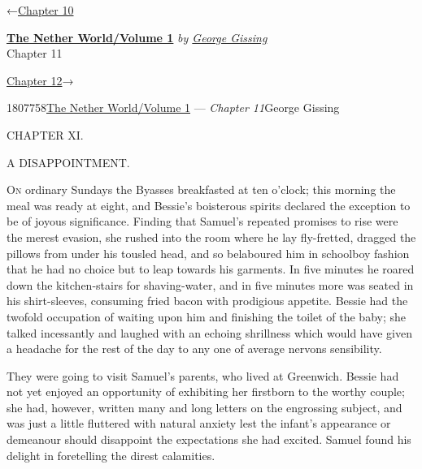 \hypertarget{headerContainer}{}
\hypertarget{navigationHeader}{}
\protect\hypertarget{headerprevious}{}{←\href{/wiki/The_Nether_World/Volume_1/Chapter_10}{Chapter
10}}

\textbf{\protect\hypertarget{header_title_text}{}{\href{/w/index.php?title=The_Nether_World/Volume_1\&action=edit\&redlink=1}{The
Nether World/Volume 1}}} \emph{by
\href{/wiki/Author:George_Gissing}{\protect\hypertarget{header_author_text}{}{{George
Gissing}}}}\\
\protect\hypertarget{header_section_text}{}{Chapter 11}

\protect\hypertarget{headernext}{}{\href{/wiki/The_Nether_World/Volume_1/Chapter_12}{Chapter
12}→}

\hypertarget{navigationNotes}{}

\hypertarget{ws-data}{}
\protect\hypertarget{ws-article-id}{}{1807758}\protect\hypertarget{ws-title}{}{\href{/w/index.php?title=The_Nether_World/Volume_1\&action=edit\&redlink=1}{The
Nether World/Volume 1} --- \emph{Chapter
11}}\protect\hypertarget{ws-author}{}{George Gissing}

{\protect\hypertarget{234}{}{}}

{CHAPTER XI.}

A DISAPPOINTMENT.

\textsc{On} ordinary Sundays the Byasses breakfasted at ten o'clock;
this morning the meal was ready at eight, and Bessie's boisterous
spirits declared the exception to be of joyous significance. Finding
that Samuel's repeated promises to rise were the merest evasion, she
rushed into the room where he lay fly-fretted, dragged the pillows from
under his tousled head, and so belaboured him in schoolboy fashion that
he had no choice but to leap towards his garments. In five minutes he
roared down the kitchen-stairs for shaving-water, and in five minutes
more was seated in his shirt-sleeves, consuming fried bacon with
prodigious appetite. Bessie had the twofold occupation of waiting upon
him and finishing the toilet of the baby; she talked
{\protect\hypertarget{235}{}{}}incessantly and laughed with an echoing
shrillness which would have given a headache for the rest of the day to
any one of average nervons sensibility.

They were going to visit Samuel's parents, who lived at Greenwich.
Bessie had not yet enjoyed an opportunity of exhibiting her firstborn to
the worthy couple; she had, however, written many and long letters on
the engrossing subject, and was just a little fluttered with natural
anxiety lest the infant's appearance or demeanour should disappoint the
expectations she had excited. Samuel found his delight in foretelling
the direst calamities.

